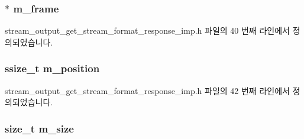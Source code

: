 \subsubsection[{\texorpdfstring{m\+\_\+frame}{m_frame}}]{$\ast$ m\+\_\+frame\hspace{0.3cm}{\ttfamily [private]}}\hypertarget{classavdecc__lib_1_1stream__output__get__stream__format__response__imp_a50417969cf438e7c8d698726bbbe2ff9}{}\label{classavdecc__lib_1_1stream__output__get__stream__format__response__imp_a50417969cf438e7c8d698726bbbe2ff9}


stream\+\_\+output\+\_\+get\+\_\+stream\+\_\+format\+\_\+response\+\_\+imp.\+h 파일의 40 번째 라인에서 정의되었습니다.

\subsubsection[{\texorpdfstring{m\+\_\+position}{m_position}}]{\setlength{\rightskip}{0pt plus 5cm}ssize\+\_\+t m\+\_\+position\hspace{0.3cm}{\ttfamily [private]}}\hypertarget{classavdecc__lib_1_1stream__output__get__stream__format__response__imp_af5e691c4a8a0feb07f48440b321206cd}{}\label{classavdecc__lib_1_1stream__output__get__stream__format__response__imp_af5e691c4a8a0feb07f48440b321206cd}


stream\+\_\+output\+\_\+get\+\_\+stream\+\_\+format\+\_\+response\+\_\+imp.\+h 파일의 42 번째 라인에서 정의되었습니다.

\subsubsection[{\texorpdfstring{m\+\_\+size}{m_size}}]{\setlength{\rightskip}{0pt plus 5cm}size\+\_\+t m\+\_\+size\hspace{0.3cm}{\ttfamily [private]}}\hypertarget{classavdecc__lib_1_1stream__output__get__stream__format__response__imp_a0dc3c363255f193681c77b4d2a82e995}{}\label{classavdecc__lib_1_1stream__output__get__stream__format__response__imp_a0dc3c363255f193681c77b4d2a82e995}


